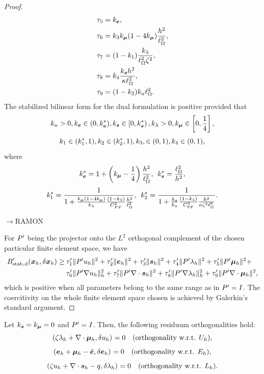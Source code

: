 \begin{proof}
\begin{align*}
    \ttm &= \ke,\\
    \ttdu &= \kPu\km(1-4\km)\frac{h^2}{\length^2},\\
    \ttds &= (1-\kYus)\frac{\kl}{\length^2\zeta^2},\\
    \ttdl &= \kPl\frac{\ks h^2}{\kappa\length^2},\\
    \ttdm &= (1-\kYlm)\ku \length^2.
\end{align*}
The stabilized bilinear form for the dual formulation is positive provided that
$$    
\ku> 0,\ke\in(0,\ke^*),\ks\in\left[0,\ks^*\right),\kl > 0,\km\in\left[0,\frac14\right],
$$
$$
\kYus\in(\kYus^*,1),\kYlm\in(\kYlm^*,1),\kPu,\in(0,1),\kPl\in(0, 1),
$$
where
$$
\ke^* = 1+\left(\km-\frac14\right)\frac{h^2}{\length^2},
\:\:
\ks^* = \frac{\length^2}{h^2}, 
$$
$$
\kYus^* = \frac{1}{1+\frac{\km (1-4\km)}{\kl}\frac{(1-\kPu)}{C^2_{PF}}\frac{h^2}{\length^2}}, 
\:\:
\kYlm^* = \frac{1}{1+\frac{\ks}{\ku}\frac{(1-\kPl)}{\CPF^2}\frac{h^2}{\kappa\zeta^2\length^6}}.
$$

\noindent$\rightarrow$RAMON

For $\Pt$ being the projector onto the $L^2$ orthogonal complement of the chosen particular finite element space, we have
\begin{align*}
\Bsd'(\xFh,\delta\xFh) \geq 
&\: \ttu'\norm[]{\Pt\uFh}^2+
    \tte'\norm[]{\eFh}^2+
    \tts'\norm[]{\sFh}^2+
    \ttl'\norm[]{\Pt\lFh}^2+
    \ttm'\norm[]{\Pt\mFh}^2+
    \\    
&\: \ttdu'\norm[h]{\Pt\nabla\uFh}^2+
    \ttds'\norm[]{\Pt\nabla\cdot\sFh}^2+ 
    \ttdl'\norm[h]{\Pt\nabla\lFh}^2+
    \ttdm'\norm[]{\Pt\nabla\cdot\mFh}^2,
\end{align*}
which is positive when all parameters belong to the same range as in $\Pt = I$.
The coercitivity on the whole finite element space chosen is achieved by Galerkin's standard argument.

\end{proof}

\begin{proposition}
Let $\ks = \km = 0$ and $\Pt = I$. Then, the following residuum orthogonalities hold: 
$$\iprod[]{\zeta\lFh+\nabla\cdot\mFh}{\delta\uFh} =  0\quad(\text{orthogonality w.r.t. }U_h),$$
$$\iprod[]{\eFh+\mFh-\eFt                 }{\delta\eFh} = 0\quad(\text{orthogonality w.r.t. } E_h),$$
$$\iprod[]{\zeta\uFh+\nabla\cdot\sFh-q}{\delta\lFh} = 0\quad(\text{orthogonality w.r.t. }L_h) .$$
\end{proposition}

